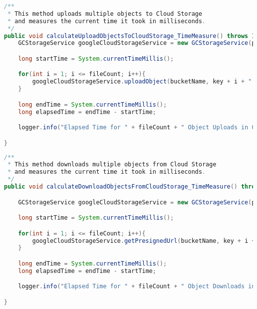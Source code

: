 \begin{lstlisting}[language=Java, caption=calculateUploadObjectsToCloudStorage\_TimeMeasure() Methode der Klasse PerformanceTest]
/**
 * This method uploads multiple objects to Cloud Storage
 * and measures the current time it took in milliseconds.
 */
public void calculateUploadObjectsToCloudStorage_TimeMeasure() throws IOException {
    GCStorageService googleCloudStorageService = new GCStorageService(projectId, gcJsonKeyPath);

    long startTime = System.currentTimeMillis();

    for(int i = 1; i <= fileCount; i++){
        googleCloudStorageService.uploadObject(bucketName, key + i + ".txt", filePath + key + i + ".txt", gc_encryption_key, storageClass);
    }

    long endTime = System.currentTimeMillis();
    long elapsedTime = endTime - startTime;

    logger.info("Elapsed Time for " + fileCount + " Object Uploads in Cloud Storage: " + elapsedTime +  " ms.");

}
\end{lstlisting}

\newpage

\begin{lstlisting}[language=Java, caption=calculateDownloadObjectsFromCloudStorage\_TimeMeasure() Methode der Klasse PerformanceTest]
/**
 * This method downloads multiple objects from Cloud Storage
 * and measures the current time it took in milliseconds.
 */
public void calculateDownloadObjectsFromCloudStorage_TimeMeasure() throws IOException {

    GCStorageService googleCloudStorageService = new GCStorageService(projectId, gcJsonKeyPath);

    long startTime = System.currentTimeMillis();

    for(int i = 1; i <= fileCount; i++){
        googleCloudStorageService.getPresignedUrl(bucketName, key + i + ".txt", 60, gc_encryption_key);
    }

    long endTime = System.currentTimeMillis();
    long elapsedTime = endTime - startTime;

    logger.info("Elapsed Time for " + fileCount + " Object Downloads in Cloud Storage: " + elapsedTime +  " ms.");

}
\end{lstlisting}

